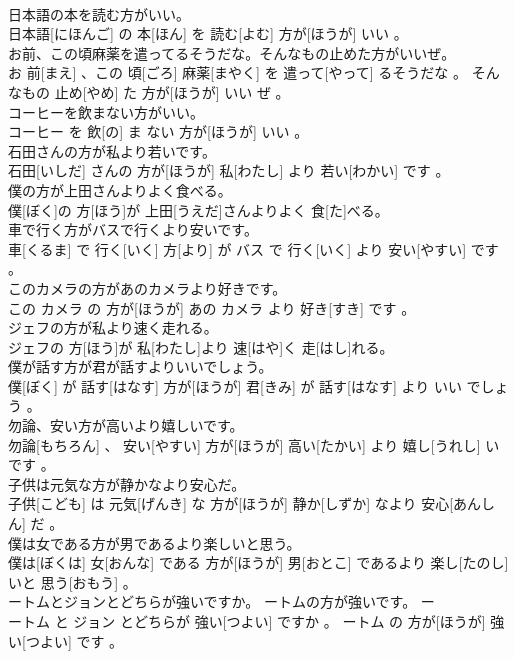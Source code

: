 \documentclass[8pt]{extreport}
\begin{document}
\begin{CJK}{UTF8}{min}
\\	日本語の本を読む方がいい。	
\\	日本語[にほんご] の 本[ほん] を 読む[よむ] 方が[ほうが] いい 。
\\	お前、この頃麻薬を遣ってるそうだな。そんなもの止めた方がいいぜ。	
\\	お 前[まえ] 、この 頃[ごろ] 麻薬[まやく] を 遣って[やって] るそうだな 。 そんなもの 止め[やめ] た 方が[ほうが] いい ぜ 。
\\	コーヒーを飲まない方がいい。	
\\	コーヒー を 飲[の] ま ない 方が[ほうが] いい 。
\\	石田さんの方が私より若いです。	
\\	石田[いしだ] さんの 方が[ほうが] 私[わたし] より 若い[わかい] です 。
\\	僕の方が上田さんよりよく食べる。	
\\	僕[ぼく]の 方[ほう]が 上田[うえだ]さんよりよく 食[た]べる。
\\	車で行く方がバスで行くより安いです。	
\\	車[くるま] で 行く[いく] 方[より] が バス で 行く[いく] より 安い[やすい] です 。
\\	このカメラの方があのカメラより好きです。	
\\	この カメラ の 方が[ほうが] あの カメラ より 好き[すき] です 。
\\	ジェフの方が私より速く走れる。	
\\	ジェフの 方[ほう]が 私[わたし]より 速[はや]く 走[はし]れる。
\\	僕が話す方が君が話すよりいいでしょう。	
\\	僕[ぼく] が 話す[はなす] 方が[ほうが] 君[きみ] が 話す[はなす] より いい でしょう 。
\\	勿論、安い方が高いより嬉しいです。	
\\	勿論[もちろん] 、 安い[やすい] 方が[ほうが] 高い[たかい] より 嬉し[うれし] いです 。
\\	子供は元気な方が静かなより安心だ。	
\\	子供[こども] は 元気[げんき] な 方が[ほうが] 静か[しずか] なより 安心[あんしん] だ 。
\\	僕は女である方が男であるより楽しいと思う。	
\\	僕は[ぼくは] 女[おんな] である 方が[ほうが] 男[おとこ] であるより 楽し[たのし] いと 思う[おもう] 。
\\	ートムとジョンとどちらが強いですか。 ートムの方が強いです。	ー
\\	ートム と ジョン とどちらが 強い[つよい] ですか 。 ートム の 方が[ほうが] 強い[つよい] です 。

\end{CJK}
\end{document}
